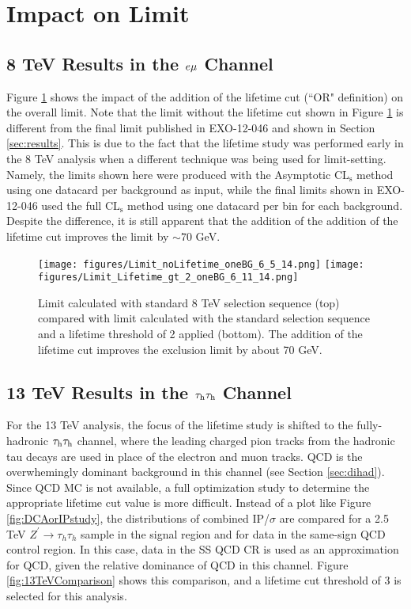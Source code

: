 \section{Impact on Limit}

\subsection{8 TeV Results in the $e\mu$ Channel}

Figure \ref{fig:8TeVLifetimeLimits} shows the impact of the addition of the lifetime cut (``OR" definition) on the overall limit. Note that the limit without the lifetime cut shown in Figure \ref{fig:8TeVLifetimeLimits} is different from the final limit published in EXO-12-046 and shown in Section \ref{sec:results}. This is due to the fact that the lifetime study was performed early in the 8 TeV analysis when a different technique was being used for limit-setting. Namely, the limits shown here were produced with the Asymptotic $\textrm{CL}_{\textrm{s}}$ method\cite{HiggsCombine} using one datacard per background as input, while the final limits shown in EXO-12-046 used the full $\textrm{CL}_{\textrm{s}}$ method\cite{HiggsCombine} using one datacard per bin for each background. Despite the difference, it is still apparent that the addition of the addition of the lifetime cut improves the limit by $\sim70$ GeV.

\begin{figure}[tbh!]
\centering
\texttt{[image: figures/Limit\_noLifetime\_oneBG\_6\_5\_14.png]}
\texttt{[image: figures/Limit\_Lifetime\_gt\_2\_oneBG\_6\_11\_14.png]}
\caption{Limit calculated with standard 8 TeV selection sequence (top) compared with limit calculated with the standard selection sequence and a lifetime threshold of 2 applied (bottom). The addition of the lifetime cut improves the exclusion limit by about 70 GeV.}
\label{fig:8TeVLifetimeLimits}
\end{figure}

\subsection{13 TeV Results in the $\tau_{\textrm{h}}\tau_{\textrm{h}}$ Channel}

For the 13 TeV analysis, the focus of the lifetime study is shifted to the fully-hadronic $\tau_{\textrm{h}}\tau_{\textrm{h}}$ channel, where the leading charged pion tracks from the hadronic tau decays are used in place of the electron and muon tracks. QCD is the overwhemingly dominant background in this channel (see Section \ref{sec:dihad}). Since QCD MC is not available, a full optimization study to determine the appropriate lifetime cut value is more difficult. Instead of a plot like Figure \ref{fig:DCAorIPstudy}, the distributions of combined IP/$\sigma$ are compared for a 2.5 TeV $Z^\prime\to\tau_h\tau_h$ sample in the signal region and for data in the same-sign QCD control region. In this case, data in the SS QCD CR is used as an approximation for QCD, given the relative dominance of QCD in this channel. Figure \ref{fig:13TeVComparison} shows this comparison, and a lifetime cut threshold of 3 is selected for this analysis.

